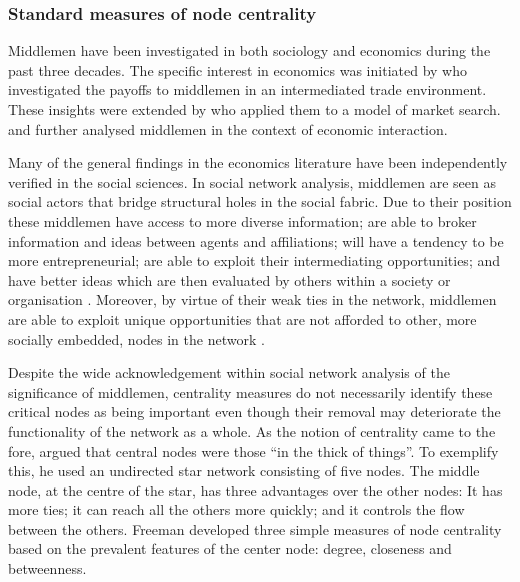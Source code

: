 \subsubsection{Standard measures of node centrality}

Middlemen have been investigated in both sociology and economics during the past three decades. The specific interest in economics was initiated by \citet{KalaiMiddlemen1978} who investigated the payoffs to middlemen in an intermediated trade environment. These insights were extended by \citet{RubinsteinWolinsky1987} who applied them to a model of market search. \citet{JacksonWolinsky1996} and \citet{GillesChakrabarti2006} further analysed middlemen in the context of economic interaction.

Many of the general findings in the economics literature have been independently verified in the social sciences. In social network analysis, middlemen are seen as social actors that bridge structural holes in the social fabric. Due to their position these middlemen have access to more diverse information; are able to broker information and ideas between agents and affiliations; will have a tendency to be more entrepreneurial; are able to exploit their intermediating opportunities; and have better ideas which are then evaluated by others within a society or organisation \citep{Burt1992, Burt2004, Burt2005, Burt2010}. Moreover, by virtue of their weak ties in the network, middlemen are able to exploit unique opportunities that are not afforded to other, more socially embedded, nodes in the network \citep{Granovetter1973, Granovetter2005}.

Despite the wide acknowledgement within social network analysis of the significance of middlemen, centrality measures do not necessarily identify these critical nodes as being important even though their removal may deteriorate the functionality of the network as a whole. As the notion of centrality came to the fore, \citet[p.~219]{Freeman1979} argued that central nodes were those ``in the thick of things''. To exemplify this, he used an undirected star network consisting of five nodes. The middle node, at the centre of the star, has three advantages over the other nodes: It has more ties; it can reach all the others more quickly; and it controls the flow between the others. Freeman developed three simple measures of node centrality based on the prevalent features of the center node: degree, closeness and betweenness.

